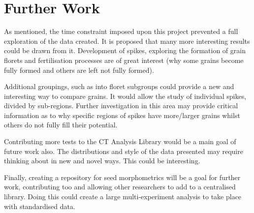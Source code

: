 \documentclass[11pt]{report}
\begin{document}
\section{Further Work}
\label{sec:org0bca27c}

As mentioned, the time constraint imposed upon this project prevented a full exploration of the data created. It is proposed that many more interesting results could be drawn from it. Development of spikes, exploring the formation of grain florets and fertilisation processes are of great interest (why some grains become fully formed and others are left not fully formed).

Additional groupings, such as into floret subgroups could provide a new and interesting way to compare grains. It would allow the study of individual spikes, divided by sub-regions. Further investigation in this area may provide critical information as to why specific regions of spikes have more/larger grains whilst others do not fully fill their potential.

Contributing more tests to the CT Analysis Library would be a main goal of future work also. The distributions and style of the data presented may require thinking about in new and novel ways. This could be interesting.

Finally, creating a repository for seed morphometrics will be a goal for further work, contributing too and allowing other researchers to add to a centralised library. Doing this could create a large multi-experiment analysis to take place with standardised data.


\appendix
\end{document}
